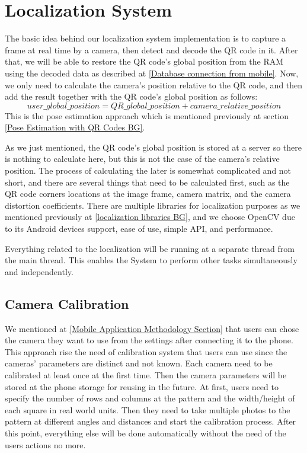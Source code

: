 \section{Localization System}
\label{Localization System Methodology}
The basic idea behind our localization system implementation is to capture a frame at real time by a camera, then detect and decode the QR code in it. After that, we will be able to restore the QR code's global position from the RAM using the decoded data as described at \ref{Database connection from mobile}. Now, we only need to calculate the camera's position relative to the QR code, and then add the result together with the QR code's global position as follows:
\[ user\_global\_position = QR\_global\_position +  camera\_relative\_position\]
This is the pose estimation approach which is mentioned previously at section \ref{Pose Estimation with QR Codes BG}.

As we just mentioned, the QR code's global position is stored at a server so there is nothing to calculate here, but this is not the case of the camera's relative position. The process of calculating the later is somewhat complicated and not short, and there are several things that need to be calculated first, such as the QR code corners locations at the image frame, camera matrix, and the camera distortion coefficients. There are multiple libraries for localization purposes as we mentioned previously at \ref{localization libraries BG}, and we choose OpenCV due to its Android devices support, ease of use, simple API, and performance.

Everything related to the localization will be running at a separate thread from the main thread. This enables the System to perform other tasks simultaneously and independently.

\subsection{Camera Calibration}
We mentioned at \ref{Mobile Application Methodology Section} that users can chose the camera they want to use from the settings after connecting it to the phone. This approach rise the need of calibration system that users can use since the cameras' parameters are distinct and not known. Each camera need to be calibrated at least once at the first time. Then the camera parameters will be stored at the phone storage for reusing in the future. At first, users need to specify the number of rows and columns at the pattern and the width/height of each square in real world units. Then they need to take multiple photos to the pattern at different angles and distances and start the calibration process. After this point, everything else will be done automatically without the need of the users actions no more. 

